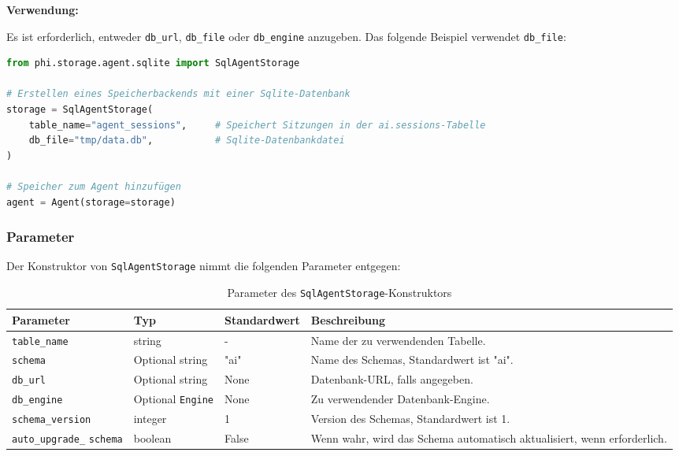 \textbf{Verwendung:}

Es ist erforderlich, entweder \texttt{db\_url}, \texttt{db\_file} oder \texttt{db\_engine} anzugeben. Das folgende Beispiel verwendet \texttt{db\_file}:

\begin{lstlisting}[language=Python, style=pythonstyle, caption={Verwendung von \texttt{SqlAgentStorage}}]
from phi.storage.agent.sqlite import SqlAgentStorage

# Erstellen eines Speicherbackends mit einer Sqlite-Datenbank
storage = SqlAgentStorage(
    table_name="agent_sessions",     # Speichert Sitzungen in der ai.sessions-Tabelle
    db_file="tmp/data.db",           # Sqlite-Datenbankdatei
)

# Speicher zum Agent hinzufügen
agent = Agent(storage=storage)
\end{lstlisting}

\subsubsection{Parameter}

Der Konstruktor von \texttt{SqlAgentStorage} nimmt die folgenden Parameter entgegen:

\begin{table}[h]
    \caption{Parameter des \texttt{SqlAgentStorage}-Konstruktors}
    \centering
    \begin{tabular}{|p{3cm}|p{3cm}|p{3cm}|p{6cm}|}
        \hline
        \textbf{Parameter}        & \textbf{Typ}      & \textbf{Standardwert} & \textbf{Beschreibung}                                        \\
        \hline
        \texttt{table\_name}      & string             & -                & Name der zu verwendenden Tabelle.                              \\
        \texttt{schema}           & Optional string    & "ai"             & Name des Schemas, Standardwert ist "ai".                        \\
        \texttt{db\_url}          & Optional string    & None             & Datenbank-URL, falls angegeben.                                \\
        \texttt{db\_engine}       & Optional \texttt{Engine} & None         & Zu verwendender Datenbank-Engine.                              \\
        \texttt{schema\_version}  & integer            & 1                & Version des Schemas, Standardwert ist 1.                        \\
        \texttt{auto\_}\texttt{upgrade\_} \texttt{schema} & boolean        & False            & Wenn wahr, wird das Schema automatisch aktualisiert, wenn erforderlich. \\
        \hline
    \end{tabular}
\end{table}


